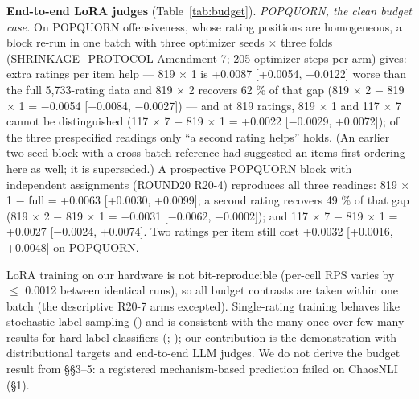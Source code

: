 \documentclass[10pt,twocolumn]{article}
\begin{document}
\textbf{End-to-end LoRA judges} (Table~\ref{tab:budget}). \emph{POPQUORN, the clean budget case.} On POPQUORN offensiveness, whose rating positions are homogeneous, a block re-run in one batch with three optimizer seeds $\times$ three folds (SHRINKAGE\_PROTOCOL Amendment 7; 205 optimizer steps per arm) gives: extra ratings per item help --- 819 $\times$ 1 is +0.0087 {[}+0.0054, +0.0122{]} worse than the full 5,733-rating data and 819 $\times$ 2 recovers 62 \% of that gap (819 $\times$ 2 $-$ 819 $\times$ 1 = $-$0.0054 {[}$-$0.0084, $-$0.0027{]}) --- and at 819 ratings, 819 $\times$ 1 and 117 $\times$ 7 cannot be distinguished (117 $\times$ 7 $-$ 819 $\times$ 1 = +0.0022 {[}$-$0.0029, +0.0072{]}); of the three prespecified readings only ``a second rating helps'' holds. (An earlier two-seed block with a cross-batch reference had suggested an items-first ordering here as well; it is superseded.) A prospective POPQUORN block with independent assignments (ROUND20 R20-4) reproduces all three readings: 819 $\times$ 1 $-$ full = +0.0063 {[}+0.0030, +0.0099{]}; a second rating recovers 49 \% of that gap (819 $\times$ 2 $-$ 819 $\times$ 1 = $-$0.0031 {[}$-$0.0062, $-$0.0002{]}); and 117 $\times$ 7 $-$ 819 $\times$ 1 = +0.0027 {[}$-$0.0024, +0.0074{]}. Two ratings per item still cost +0.0032 {[}+0.0016, +0.0048{]} on POPQUORN.

LoRA training on our hardware is not bit-reproducible (per-cell RPS varies by $\leq$ 0.0012 between identical runs), so all budget contrasts are taken within one batch (the descriptive R20-7 arms excepted). Single-rating training behaves like stochastic label sampling (\citealp{gheibi2026same}) and is consistent with the many-once-over-few-many results for hard-label classifiers (\citealp{khetan2018learning}; \citealp{lin2014relabel}); our contribution is the demonstration with distributional targets and end-to-end LLM judges. We do not derive the budget result from \S{}\S{}3--5: a registered mechanism-based prediction failed on ChaosNLI (\S{}1).
\end{document}
